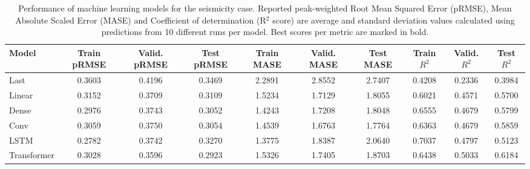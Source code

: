 \begin{table}
\caption{Performance of machine learning models for the seismicity case. Reported peak-weighted Root Mean Squared Error (pRMSE), Mean Absolute Scaled Error (MASE) and Coefficient of determination (R$^2$ score) are average and standard deviation values calculated using predictions from 10 different runs per model. Best scores per metric are marked in bold.}
\label{tab:ml_perf_seis}
\begin{tabular}{lccccccccc}
\toprule
Model & Train pRMSE & Valid. pRMSE & Test pRMSE & Train MASE & Valid. MASE & Test MASE & Train $R^2$ & Valid. $R^2$ & Test $R^2$ \\
\midrule
Last & 0.3603 & 0.4196 & 0.3469 & 2.2891 & 2.8552 & 2.7407 & 0.4208 & 0.2336 & 0.3984 \\
Linear & 0.3152 & 0.3709 & 0.3109 & 1.5234 & 1.7129 & 1.8055 & 0.6021 & 0.4571 & 0.5700 \\
Dense & 0.2976 & 0.3743 & 0.3052 & 1.4243 & 1.7208 & 1.8048 & 0.6555 & 0.4679 & 0.5799 \\
Conv & 0.3059 & 0.3750 & 0.3054 & 1.4539 & 1.6763 & 1.7764 & 0.6363 & 0.4679 & 0.5859 \\
LSTM & 0.2782 & 0.3742 & 0.3270 & 1.3775 & 1.8387 & 2.0640 & 0.7037 & 0.4797 & 0.5123 \\
Transformer & 0.3028 & 0.3596 & 0.2923 & 1.5326 & 1.7405 & 1.8703 & 0.6438 & 0.5033 & 0.6184 \\
\bottomrule
\end{tabular}
\end{table}
